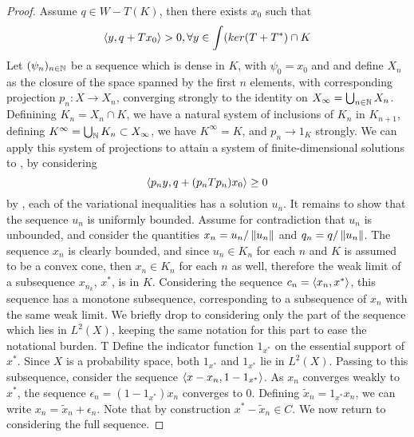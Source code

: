 \begin{proof}
	Assume $q \in W - T(K)$, then there exists $x_0$ such that
	\begin{equation}
		\label{eq:var_ineq}
		\left \langle y,q+Tx_0 \right \rangle > 0, \forall y \in \int(ker(T+T^*) \cap K
	\end{equation}
	Let $(\psi_n)_{n\in \mathbb{N}}$ be a sequence which is dense in $K$, with $\psi_0 = x_0$ and and define $X_n$ as the closure of the space spanned by the first $n$ elements, with corresponding projection $p_n: X \to X_n$, converging strongly to the identity on $X_{\infty} = \bigcup_{n \in \mathbb{N}} X_n$. Definining $K_n = X_n \cap K$, we have a natural system of inclusions of $K_n$ in $K_{n+1}$, defining $K^\infty = \bigcup_{\mathbb{N}} K_n \subset X_\infty$, we have $K^\infty = K$, and $p_n \to 1_K$ strongly. We can apply this system of projections to attain a system of finite-dimensional solutions to , by considering
\begin{equation}
	\left \langle p_n y,q+(p_nTp_n) x_0 \right \rangle \geq 0
\end{equation}
by , each of the variational inequalities has a solution $u_n$. It remains to show that the sequence $u_n$ is uniformly bounded. Assume for contradiction that $u_n$ is unbounded, and consider the quantities $x_n = u_n/\left \Vert u_n \right \Vert$ and $q_n = q / \left \Vert u_n \right \Vert$. The sequence $x_n$ is clearly bounded, and since $u_n \in K_n$ for each $n$ and $K$ is assumed to be a convex cone, then $x_n \in K_n$ for each $n$ as well, therefore the weak limit of a subsequence $x_{n_k}$, $x^*$, is in $K$.  Considering the sequence $c_n = \left \langle x_n,x^* \right \rangle$, this sequence has a monotone subsequence, corresponding to a subsequence of $x_n$ with the same weak limit. We briefly drop to considering only the part of the sequence which lies in $L^2(X)$, keeping the same notation for this part to ease the notational burden. T
Define the indicator function $1_{x^*}$ on the essential support of $x^*$. Since $X$ is a probability space, both $1_{x^*}$ and $1_{x^*}$ lie in $L^2(X)$.
Passing to this subsequence, consider the sequence $\left \langle x-x_n,1-1_{x^*} \right \rangle$. As $x_n$ converges weakly to $x^*$, the sequence $\epsilon_n=(1-1_{x^*})x_n$ converges to 0. Defining $\tilde{x}_n =1_{x^*} x_n$, we can write $x_n = \tilde{x}_n + \epsilon_n$. Note that by construction $x^*-\tilde{x}_n \in C$. We now return to considering the full sequence.


\end{proof}
